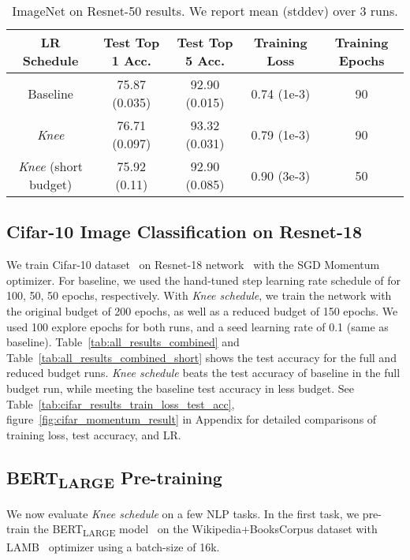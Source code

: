 \documentclass{article} \usepackage{iclr2021_conference,times}
\newcommand{\lrschedule}{\textit{Knee schedule}}
\newcommand{\lrscheduleshort}{\textit{Knee}}
\begin{document}
\begin{table}[h]
\small
\centering
\caption{ImageNet on Resnet-50 results. We report mean (stddev) over 3 runs.}
\label{tab:imagenet_test_training_loss}
\begin{tabular}{ccccc}
\toprule
\multirow{1}{*}{LR Schedule}  & Test Top 1 Acc. & Test Top 5 Acc. & Training Loss & Training Epochs\\
\midrule
  Baseline     & \multirow{1}{*}{75.87 (0.035)} & \multirow{1}{*}{92.90 (0.015)} & \multirow{1}{*}{0.74 (1e-3)} & 90\\
  \lrscheduleshort{}     & \multirow{1}{*}{76.71 (0.097)} & \multirow{1}{*}{93.32 (0.031)} & \multirow{1}{*}{0.79 (1e-3)} & 90\\
  \lrscheduleshort{} (short budget)    & \multirow{1}{*}{75.92 (0.11)} & \multirow{1}{*}{92.90 (0.085)} & \multirow{1}{*}{0.90 (3e-3)} & 50\\
\bottomrule
\end{tabular}
\end{table}

\subsection{Cifar-10 Image Classification on Resnet-18}

We train Cifar-10 dataset~\citep{cifar-10-dataset} on Resnet-18 network~\citep{resnet_he_2016} with the SGD Momentum optimizer. For baseline, we used the hand-tuned step learning rate schedule of  for 100, 50, 50 epochs, respectively. With \lrschedule{}, we train the network with the original budget of 200 epochs, as well as a reduced budget of 150 epochs. We used 100 explore epochs for both runs, and a seed learning rate of 0.1 (same as baseline). Table~\ref{tab:all_results_combined} and Table~\ref{tab:all_results_combined_short} shows the test accuracy for the full and reduced budget runs. \lrschedule{} beats the test accuracy of baseline in the full budget run, while meeting the baseline test accuracy in  less budget. See Table~\ref{tab:cifar_results_train_loss_test_acc}, figure~\ref{fig:cifar_momentum_result} in Appendix for detailed comparisons of training loss, test accuracy, and LR.

\subsection{BERT\textsubscript{LARGE} Pre-training}
We now evaluate \lrschedule{} on a few NLP tasks. In the first task, we pre-train the BERT\textsubscript{LARGE} model~\citep{devlin2018bert} on the Wikipedia+BooksCorpus dataset with LAMB~\citep{bert76lamb} optimizer using a batch-size of 16k.
\end{document}
